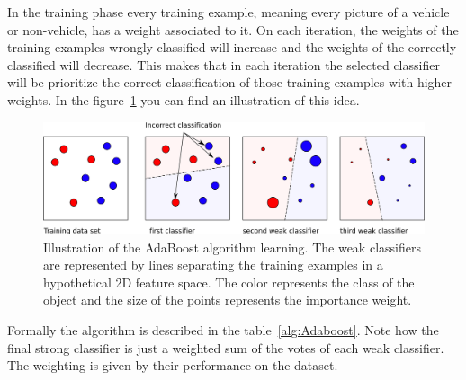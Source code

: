 In the training phase every training example, meaning every picture of a
vehicle or non-vehicle, has a weight associated to it. On each iteration, the
weights of the training examples wrongly classified will increase and the
weights of the correctly classified will decrease. This makes that in each
iteration the selected classifier will be prioritize the correct classification
of those training examples with higher weights. In the figure~\ref{fig:adaboost}
you can find an illustration of this idea.

\begin{figure}
\begin{center}
    \includegraphics[scale=0.6]{img/adaboost.png}
\end{center}
\caption{Illustration of the AdaBoost algorithm learning. The weak classifiers
are represented by lines separating the training examples in a hypothetical 2D
feature space. The color represents the class of the object and the size of the
points represents the importance weight.}
\label{fig:adaboost}
\end{figure}

Formally the algorithm is described in the table~\ref{alg:Adaboost}. Note how
the final strong classifier is just a weighted sum of the votes of each weak
classifier. The weighting is given by their performance on the dataset.


